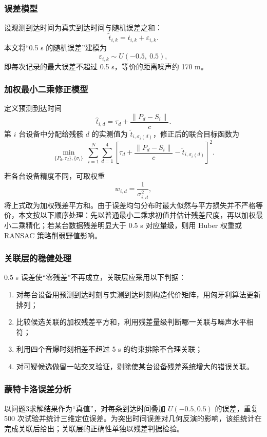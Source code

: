 \documentclass[12pt,a4paper]{article}
\begin{document}
\subsubsection{误差模型}

设观测到达时间为真实到达时间与随机误差之和：
\[
\tilde{t}_{i,k}=t_{i,k}+\varepsilon_{i,k}.
\]
本文将“0.5 s 的随机误差”建模为
\[
\varepsilon_{i,k}\sim U(-0.5,\ 0.5),
\]
即每次记录的最大误差不超过 0.5 s，等价的距离噪声约 170 m。

\subsubsection{加权最小二乘修正模型}

定义预测到达时间
\[
\hat{t}_{i,d}=\tau_d+\frac{\|P_d-S_i\|}{c}.
\]
第 $i$ 台设备中分配给残骸 $d$ 的实测值为 $\tilde{t}_{i,\sigma_i(d)}$，修正后的联合目标函数为
\[
\min_{\{P_d,\tau_d\},\{\sigma_i\}}\ 
\sum_{i=1}^{N}\sum_{d=1}^{4}
\left[
\tau_d+\frac{\|P_d-S_i\|}{c}-\tilde{t}_{i,\sigma_i(d)}
\right]^2.
\]

若各台设备精度不同，可取权重
\[
w_{i,d}=\frac{1}{\sigma_{i,d}^{2}},
\]
将上式改为加权残差平方和。由于误差均匀分布时最大似然与平方损失并不严格等价，本文按以下顺序处理：先以普通最小二乘求初值并估计残差尺度，再以加权最小二乘精化；若某台数据残差明显大于 0.5 s 对应量级，则用 Huber 权重或 RANSAC 策略削弱野值影响。

\subsubsection{关联层的稳健处理}

0.5 s 误差使“零残差”不再成立，关联层应采用以下判据：
\begin{enumerate}[label=\arabic*.]
  \item 对每台设备用预测到达时刻与实测到达时刻构造代价矩阵，用匈牙利算法更新排列；
  \item 比较候选关联的加权残差平方和，利用残差量级判断哪一关联与噪声水平相符；
  \item 利用四个音爆时刻相差不超过 5 s 的约束排除不合理关联；
  \item 对可疑候选做留一站交叉验证，剔除使某台设备残差系统增大的错误关联。
\end{enumerate}

\subsubsection{蒙特卡洛误差分析}

以问题3求解结果作为“真值”，对每条到达时间叠加 $U(-0.5,0.5)$ 的误差，重复 500 次试验并统计三维定位误差。为突出时间误差对几何反演的影响，该组统计在完成关联后给出；关联层的正确性单独以残差判据检验。
\end{document}
